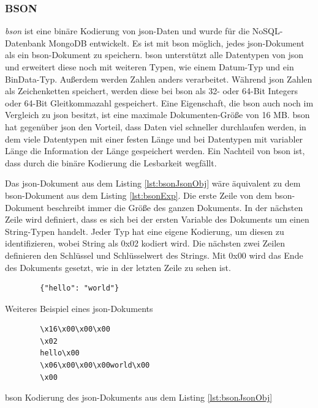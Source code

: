 \subsubsection{BSON}
\textit{\ac{bson}} ist eine binäre Kodierung von \ac{json}-Daten und wurde für die NoSQL-Datenbank MongoDB entwickelt.\cite{geeksforgeeksWhatBSON} Es ist mit \ac{bson} möglich, jedes \ac{json}-Dokument als ein \ac{bson}-Dokument zu speichern. \ac{bson} unterstützt alle Datentypen von \ac{json} und erweitert diese noch mit weiteren Typen, wie einem Datum-Typ und ein BinData-Typ. Außerdem werden Zahlen anders verarbeitet. Während \ac{json} Zahlen als Zeichenketten speichert, werden diese bei \ac{bson} als 32- oder 64-Bit Integers oder 64-Bit Gleitkommazahl gespeichert. Eine Eigenschaft, die \ac{bson} auch noch im Vergleich zu \ac{json} besitzt, ist eine maximale Dokumenten-Größe von 16 MB. \ac{bson} hat gegenüber \ac{json} den Vorteil, dass Daten viel schneller durchlaufen werden, in dem viele Datentypen mit einer festen Länge und bei Datentypen mit variabler Länge die Information der Länge gespeichert werden. Ein Nachteil von \ac{bson} ist, dass durch die binäre Kodierung die Lesbarkeit wegfällt.\cite{bsonspecBSONBinary}\cite{postgreSQLandBSON}\cite{mongodbJSONBSON}

Das \ac{json}-Dokument aus dem Listing \ref{lst:bsonJsonObj} wäre äquivalent zu dem \ac{bson}-Dokument aus dem Listing \ref{lst:bsonExp}. Die erste Zeile von dem \ac{bson}-Dokument beschreibt immer die Größe des ganzen Dokuments. In der nächsten Zeile wird definiert, dass es sich bei der ersten Variable des Dokuments um einen String-Typen handelt. Jeder Typ hat eine eigene Kodierung, um diesen zu identifizieren, wobei String als 0x02 kodiert wird. Die nächsten zwei Zeilen definieren den Schlüssel und Schlüsselwert des Strings. Mit 0x00 wird das Ende des Dokuments gesetzt, wie in der letzten Zeile zu sehen ist.

\begin{listing}[htp]
    \begin{verbatim}
        {"hello": "world"}
    \end{verbatim}
    \caption{Weiteres Beispiel eines \ac{json}-Dokuments \cite{mongodbJSONBSON}}
    \label{lst:bsonJsonObj}
\end{listing} 

\begin{listing}[htp]
    \begin{verbatim} 
        \x16\x00\x00\x00           
        \x02                      
        hello\x00                  
        \x06\x00\x00\x00world\x00  
        \x00                       
    \end{verbatim}
    \caption{\ac{bson} Kodierung des \ac{json}-Dokuments aus dem Listing \ref{lst:bsonJsonObj} \cite{mongodbJSONBSON}}
    \label{lst:bsonExp}
\end{listing}

